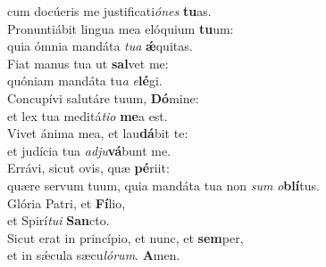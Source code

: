 \oddverse cum docúeris me justificati\textit{ó}\textit{nes} \textbf{tu}as.\\
\evenverse Pronuntiábit lingua mea elóquium \textbf{tu}um:~\*\\
\evenverse quia ómnia mandáta \textit{tu}\textit{a} \textbf{ǽ}quitas.\\
\oddverse Fiat manus tua ut \textbf{sal}vet me:~\*\\
\oddverse quóniam mandáta tu\textit{a} \textit{e}\textbf{lé}gi.\\
\evenverse Concupívi salutáre tuum, \textbf{Dó}mine:~\*\\
\evenverse et lex tua meditá\textit{ti}\textit{o} \textbf{me}a est.\\
\oddverse Vivet ánima mea, et lau\textbf{dá}bit te:~\*\\
\oddverse et judícia tua \textit{ad}\textit{ju}\textbf{vá}bunt me.\\
\evenverse Errávi, sicut ovis, quæ \textbf{pé}riit:~\*\\
\evenverse quære servum tuum, quia mandáta tua non \textit{sum} \textit{o}\textbf{blí}tus.\\
\oddverse Glória Patri, et \textbf{Fí}lio,~\*\\
\oddverse et Spirí\textit{tu}\textit{i} \textbf{San}cto.\\
\evenverse Sicut erat in princípio, et nunc, et \textbf{sem}per,~\*\\
\evenverse et in sǽcula sæcu\textit{ló}\textit{rum}. \textbf{A}men.\\
